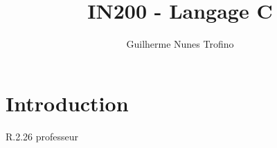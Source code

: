 \documentclass{article}
\title{IN200 - Langage C}
\author{Guilherme Nunes Trofino}
\begin{document}
\maketitle

\newpage\tableofcontents

\section{Introduction}
R.2.26 professeur
\end{document}
